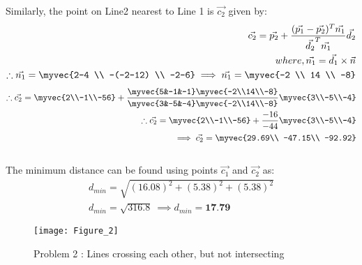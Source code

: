 \documentclass[journal,12pt,twocolumn]{IEEEtran}
\begin{document}
Similarly, the point on Line2 nearest to Line 1 is $\vec{c_2}$ given by:\\
\begin{align}
\vec{c_2}=\vec{p_2}+\frac{(\vec{p_1}-\vec{p_2})^T \vec{n_1}}{\vec{d_2}^T \vec{n_1}}\vec{d_2} \\
where, \vec{n_1}=\vec{d_1}\times \vec{n}\\
 \therefore \vec{n_1}=\myvec{2-4 \\ -(-2-12) \\ -2-6}
\implies \vec{n_1}=\myvec{-2 \\ 14 \\ -8}
\end{align}
\begin{align}
\therefore \vec{c_2}= \myvec{2\\-1\\-56}+\frac{\myvec{5&-1&-1} \myvec{-2\\14\\-8}}{\myvec{3&-5&-4} \myvec{-2\\14\\-8}}\myvec{3\\-5\\-4}\\
\therefore \vec{c_2}= \myvec{2\\-1\\-56}+\frac{-16}{-44}\myvec{3\\-5\\-4}\\
\implies \vec{c_2}=\myvec{29.69\\ -47.15\\ -92.92}
\end{align}
\\
The minimum distance can be found using points $\vec{c_1}$ and $\vec{c_2}$ as:
\begin{align}
    d_{min}=\sqrt{(16.08)^2+(5.38)^2+(5.38)^2}\\
    d_{min}=\sqrt{316.8} \ \implies d_{min}=\textbf{17.79} 
\end{align}
\begin{figure}[h!]
\centering
\texttt{[image: Figure\_2]}
\caption{Problem 2 : Lines crossing each other, but not intersecting}
\label{Fig4}
\end{figure}
\end{document}
